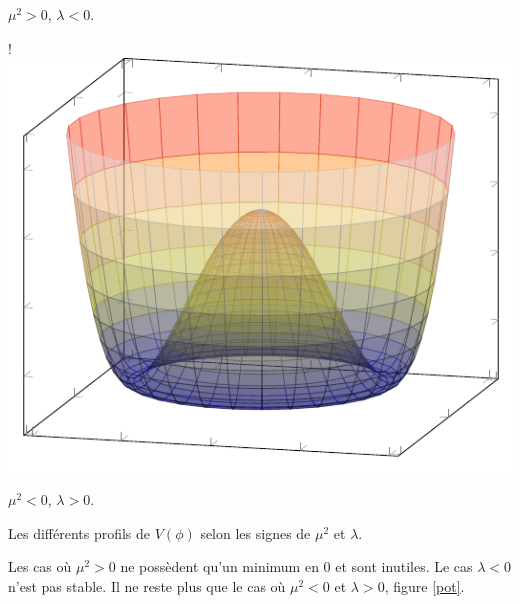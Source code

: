 {{}
\captionsetup{type=subfigure}\caption{$\mu^{2}>0$, $\lambda<0$.}
\resizebox {\marginparwidth} {!} 
{
	\includegraphics[scale=1]{SM/mp.pdf}
}
\captionsetup{type=subfigure}\caption{$\mu^{2}<0$, $\lambda>0$.}
\captionsetup{type=figure}\caption{Les différents profils de $V(\phi)$ selon les signes de $\mu^{2}$ et $\lambda$.}
\label{profile}
}
Les cas où $\mu^{2}>0$ ne possèdent qu'un minimum en $0$ et sont inutiles. Le cas $\lambda<0$ n'est pas stable. Il ne reste plus que le cas où $\mu^{2}<0$ et $\lambda>0$, figure \ref{pot}.

